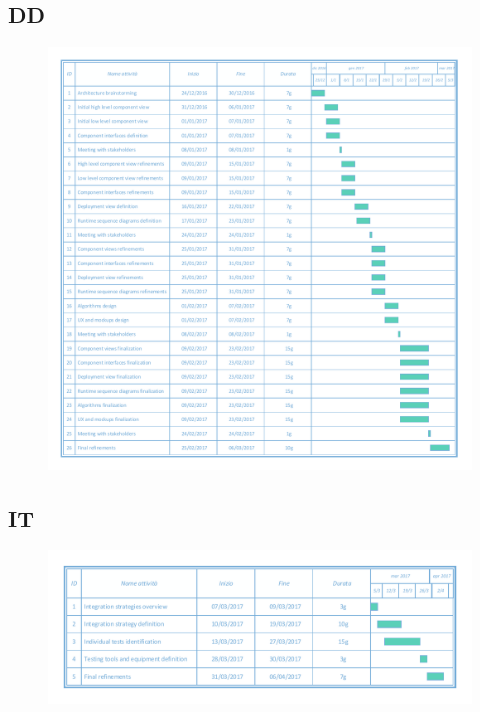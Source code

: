 \documentclass[english]{article}
\begin{document}
	\subsection{DD}
		\begin{figure}[H]
			\centering
			\includegraphics[scale=0.5]{./Images/2-DDGantt.pdf} 
		\end{figure}
		\begin{landscape}
	\subsection{IT}
		\begin{figure}[H]
			\centering
			\includegraphics[scale=0.75]{./Images/3-ITGantt.pdf} 
		\end{figure}
		\end{landscape}
\end{document}
